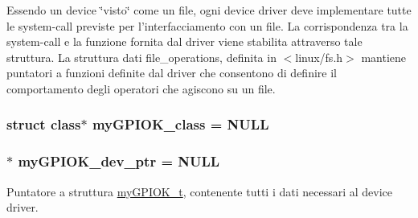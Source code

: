 Essendo un device \char`\"{}visto\char`\"{} come un file, ogni device driver deve implementare tutte le system-\/call previste per l'interfacciamento con un file. La corrispondenza tra la system-\/call e la funzione fornita dal driver viene stabilita attraverso tale struttura. La struttura dati file\+\_\+operations, definita in $<$linux/fs.\+h$>$ mantiene puntatori a funzioni definite dal driver che consentono di definire il comportamento degli operatori che agiscono su un file. \hypertarget{group___kernel-_module_gaaf8d1bce7d6389684a037e94381c275c}{
\subsubsection[{my\+G\+P\+I\+O\+K\+\_\+class}]{\setlength{\rightskip}{0pt plus 5cm}struct class$\ast$ my\+G\+P\+I\+O\+K\+\_\+class = N\+U\+L\+L\hspace{0.3cm}{\ttfamily [static]}}}\label{group___kernel-_module_gaaf8d1bce7d6389684a037e94381c275c}
\hypertarget{group___kernel-_module_gae370dfc26b06b6cc24a7bcc152f4969e}{
\subsubsection[{my\+G\+P\+I\+O\+K\+\_\+dev\+\_\+ptr}]{$\ast$ my\+G\+P\+I\+O\+K\+\_\+dev\+\_\+ptr = N\+U\+L\+L}}\label{group___kernel-_module_gae370dfc26b06b6cc24a7bcc152f4969e}


Puntatore a struttura \hyperlink{structmy_g_p_i_o_k__t}{my\+G\+P\+I\+O\+K\+\_\+t}, contenente tutti i dati necessari al device driver. 

